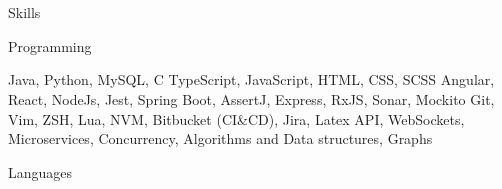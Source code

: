 \section{\faGears}{Skills}

\resumeEntryStart

\resumeEntryTD
{Programming}{}

 {Java, Python, MySQL, C}
 {TypeScript, JavaScript, HTML, CSS, SCSS}
 {Angular, React, NodeJs, Jest, Spring Boot, AssertJ, Express, RxJS, Sonar, Mockito}
 {Git, Vim, ZSH, Lua, NVM, Bitbucket (CI\&CD), Jira, Latex}
 {API, WebSockets, Microservices, Concurrency, Algorithms and Data structures, Graphs}

\resumeEntryEnd

\resumeEntryStart

\resumeEntryTD
{Languages}{}


\resumeEntryEnd
